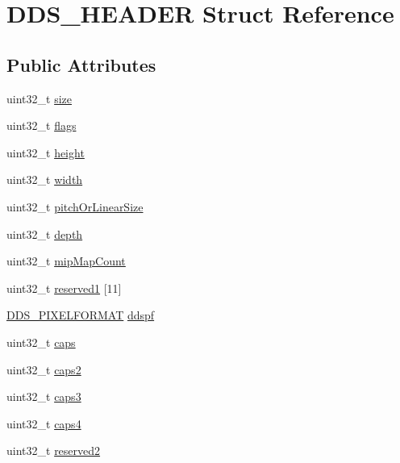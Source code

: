 \hypertarget{struct_d_d_s___h_e_a_d_e_r}{}\section{D\+D\+S\+\_\+\+H\+E\+A\+D\+ER Struct Reference}
\label{struct_d_d_s___h_e_a_d_e_r}
\subsection*{Public Attributes}
\begin{DoxyCompactItemize}
\item 
uint32\+\_\+t \hyperlink{struct_d_d_s___h_e_a_d_e_r_a989502ea402a8e5939395a6b98ae9ce0}{size}
\item 
uint32\+\_\+t \hyperlink{struct_d_d_s___h_e_a_d_e_r_a418e512458f8f02ac5102993095a2aa3}{flags}
\item 
uint32\+\_\+t \hyperlink{struct_d_d_s___h_e_a_d_e_r_a550dc15efb086708b8eac1bfebd2e617}{height}
\item 
uint32\+\_\+t \hyperlink{struct_d_d_s___h_e_a_d_e_r_a2a0b8bcd7ee4d2f097c0216c8d2c2df1}{width}
\item 
uint32\+\_\+t \hyperlink{struct_d_d_s___h_e_a_d_e_r_a77410ea1d2209672fc6651b5322a9306}{pitch\+Or\+Linear\+Size}
\item 
uint32\+\_\+t \hyperlink{struct_d_d_s___h_e_a_d_e_r_aa5b6801b932296cdfdc1651310c00c9b}{depth}
\item 
uint32\+\_\+t \hyperlink{struct_d_d_s___h_e_a_d_e_r_a17b6d75171143338b022406db274cdb3}{mip\+Map\+Count}
\item 
uint32\+\_\+t \hyperlink{struct_d_d_s___h_e_a_d_e_r_a589e935e11a1d8193101741109710319}{reserved1} \mbox{[}11\mbox{]}
\item 
\hyperlink{struct_d_d_s___p_i_x_e_l_f_o_r_m_a_t}{D\+D\+S\+\_\+\+P\+I\+X\+E\+L\+F\+O\+R\+M\+AT} \hyperlink{struct_d_d_s___h_e_a_d_e_r_a27445ea81444c05a620469f266bff154}{ddspf}
\item 
uint32\+\_\+t \hyperlink{struct_d_d_s___h_e_a_d_e_r_abe6a0e77831687e848375587e992046a}{caps}
\item 
uint32\+\_\+t \hyperlink{struct_d_d_s___h_e_a_d_e_r_aaeb2d711eeae0d04523ef4786a1120fa}{caps2}
\item 
uint32\+\_\+t \hyperlink{struct_d_d_s___h_e_a_d_e_r_a922da2c168f35e78ba99fe7d4350b422}{caps3}
\item 
uint32\+\_\+t \hyperlink{struct_d_d_s___h_e_a_d_e_r_a82a00dd554e8212cb5a002b1970b225c}{caps4}
\item 
uint32\+\_\+t \hyperlink{struct_d_d_s___h_e_a_d_e_r_a2b94becd3bfcb64930551d3bb4387198}{reserved2}
\end{DoxyCompactItemize}


